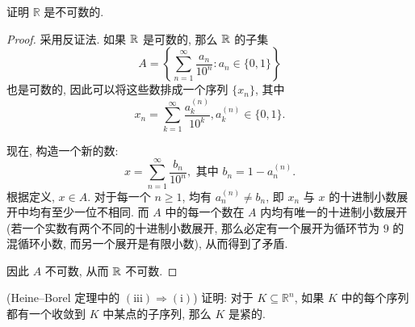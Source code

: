 \documentclass{article}
\begin{document}
\begin{problem}
  证明 $\mathbb{R}$ 是不可数的.
\end{problem}

\begin{proof}
	采用反证法. 如果 $\mathbb{R}$ 是可数的, 那么 $\mathbb{R}$ 的子集 
	\[ A = \left\{ \sum_{n=1}^{\infty} \frac{a_n}{10^{n}} : a_n\in \{0,1\}  \right\} \]
	也是可数的, 因此可以将这些数排成一个序列 $ \{x_n\} $, 其中 
	\[ x_n = \sum_{k=1}^{\infty} \frac{a_k^{(n)}}{10^k}, a_k^{(n)}\in \{0,1\} .  \]

	现在, 构造一个新的数:
	\[ x = \sum_{n=1}^{\infty} \frac{b_n}{10^n},\text{ 其中 } b_n=1-a_n^{(n)}. \]
	根据定义, $x\in A$. 对于每一个 $n \ge 1$, 均有 $a_n^{(n)}\neq b_n$, 即 $x_n$ 与 $x$ 的十进制小数展开中均有至少一位不相同. 而 $A$ 中的每一个数在 $A$ 内均有唯一的十进制小数展开 (若一个实数有两个不同的十进制小数展开, 那么必定有一个展开为循环节为 $9$ 的混循环小数, 而另一个展开是有限小数), 从而得到了矛盾.

	因此 $A$ 不可数, 从而 $\mathbb{R}$ 不可数.
\end{proof}



\begin{problem}
  (Heine--Borel 定理中的 $(\mathrm{iii})\Rightarrow(\mathrm{i})$)
  证明: 对于 $K\subseteq\mathbb{R}^n$, 如果 $K$ 中的每个序列都有一个收敛到 $K$ 中某点的子序列, 那么 $K$ 是紧的.
\end{problem}
\end{document}
